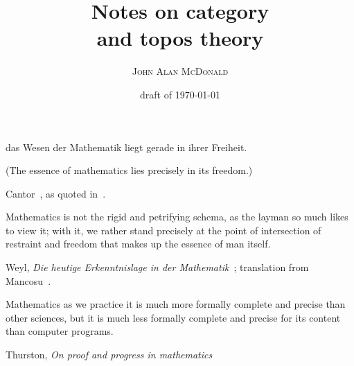 \documentclass[11pt]{book}
\title{Notes on category \\ and topos theory}
\author{\textsc{John Alan McDonald}}
\date{draft of \today}
\begin{document}
\maketitle

\setcounter{baseSectionLevel}{6}

\frontmatter

\begingroup
\let\onecolumn\twocolumn
\sffamily
\tableofcontents
\rmfamily
\endgroup

\epigraph{
das Wesen der Mathematik liegt gerade in ihrer Freiheit.
\par
(The essence of mathematics lies precisely in its freedom.)}%
{Cantor~\cite{Cantor1883},
as quoted in~\cite{ferreiros2007labyrinth}.}

\epigraph{
Mathematics is not the rigid and petrifying schema, 
as the layman so much likes to view it; with it,
 we rather stand precisely at the point of intersection 
 of restraint and freedom that makes up the essence of man itself.}
{Weyl, 
\textit{Die heutige Erkenntnislage in der Mathematik}~\cite{weyl1926heutige};
translation from Mancosu~\cite{mancosu1998brouwer}.}

\epigraph{Mathematics as we practice it is much more formally 
complete and precise than
other sciences, but it is much less formally complete and precise 
for its content than computer programs.}%
{Thurston, 
\textit{On proof and progress in mathematics
}~\cite{thurston_1994_proof}}
\end{document}
